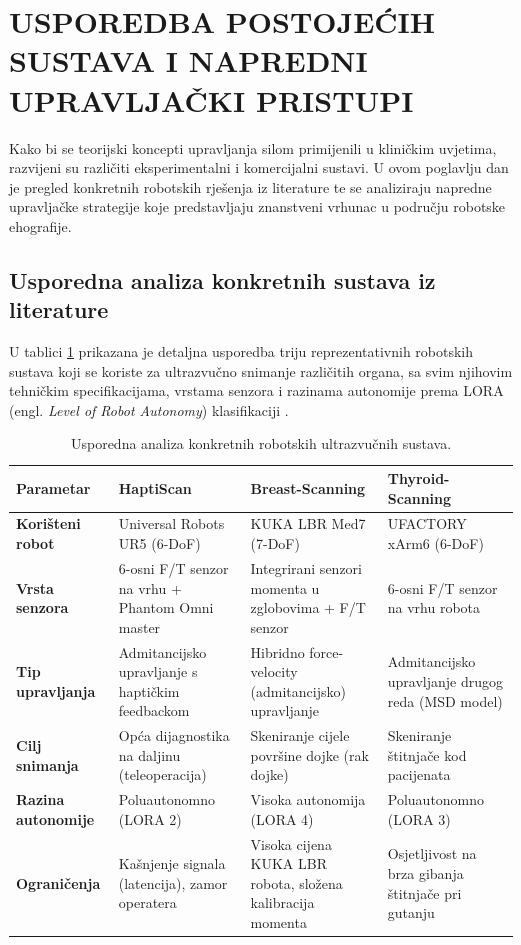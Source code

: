 
\section{USPOREDBA POSTOJEĆIH SUSTAVA I NAPREDNI UPRAVLJAČKI PRISTUPI}
\label{sec:analiza_sustava}

Kako bi se teorijski koncepti upravljanja silom primijenili u kliničkim uvjetima, razvijeni su različiti eksperimentalni i komercijalni sustavi. U ovom poglavlju dan je pregled konkretnih robotskih rješenja iz literature te se analiziraju napredne upravljačke strategije koje predstavljaju znanstveni vrhunac u području robotske ehografije.

\subsection{Usporedna analiza konkretnih sustava iz literature}
U tablici \ref{tab:usporedba_sustava} prikazana je detaljna usporedba triju reprezentativnih robotskih sustava koji se koriste za ultrazvučno snimanje različitih organa, sa svim njihovim tehničkim specifikacijama, vrstama senzora i razinama autonomije prema LORA (engl. \textit{Level of Robot Autonomy}) klasifikaciji \cite{vonhaxthausen2021medical}.

\begin{table}[H]
\centering
\caption{Usporedna analiza konkretnih robotskih ultrazvučnih sustava.}
\label{tab:usporedba_sustava}
\begin{tabularx}{\textwidth}{p{} X X X}
\toprule
\textbf{Parametar} & \textbf{HaptiScan \cite{conti2010interface}} & \textbf{Breast-Scanning \cite{ieee2023full}} & \textbf{Thyroid-Scanning \cite{li2026robotic}} \\
\midrule
\textbf{Korišteni robot} & Universal Robots UR5 (6-DoF) & KUKA LBR Med7 (7-DoF) & UFACTORY xArm6 (6-DoF) \\
\textbf{Vrsta senzora} & 6-osni F/T senzor na vrhu + Phantom Omni master & Integrirani senzori momenta u zglobovima + F/T senzor & 6-osni F/T senzor na vrhu robota \\
\textbf{Tip upravljanja} & Admitancijsko upravljanje s haptičkim feedbackom & Hibridno force-velocity (admitancijsko) upravljanje & Admitancijsko upravljanje drugog reda (MSD model) \\
\textbf{Cilj snimanja} & Opća dijagnostika na daljinu (teleoperacija) & Skeniranje cijele površine dojke (rak dojke) & Skeniranje štitnjače kod pacijenata \\
\textbf{Razina autonomije} & Poluautonomno (LORA 2) & Visoka autonomija (LORA 4) & Poluautonomno (LORA 3) \\
\textbf{Ograničenja} & Kašnjenje signala (latencija), zamor operatera & Visoka cijena KUKA LBR robota, složena kalibracija momenta & Osjetljivost na brza gibanja štitnjače pri gutanju \\
\bottomrule
\end{tabularx}
\end{table}

